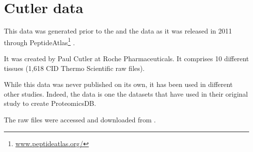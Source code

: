 \section{Cutler data}
\label{ch:cutlerData}



This data was generated prior to the  and the 
data as it was released in 2011 through PeptideAtlas\footnote{%
\href{http://www.peptideatlas.org/}{www.peptideatlas.org/}}
\citep{PeptideAtlas}.

It was created by Paul Cutler at Roche Pharmaceuticals.
It comprises 10 different tissues (1,618 \gls{CID} Thermo Scientific raw files).

While this data was never published on its own, it has been used in different
other studies. Indeed, the  data is one the datasets that
\cite{KusterData} have used in their original study to create ProteomicsDB.

The raw files were accessed and downloaded from .

\clearpage
